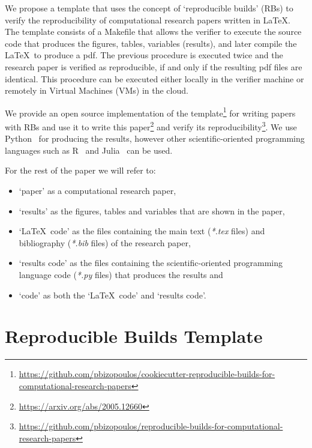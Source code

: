 \documentclass[journal]{IEEEtran}
\begin{document}
We propose a template that uses the concept of `reproducible builds' (RBs) to verify the reproducibility of computational research papers written in \LaTeX.
The template consists of a Makefile that allows the verifier to execute the source code that produces the figures, tables, variables (results), and later compile the \LaTeX\ to produce a pdf.
The previous procedure is executed twice and the research paper is verified as reproducible, if and only if the resulting pdf files are identical.
This procedure can be executed either locally in the verifier machine or remotely in Virtual Machines (VMs) in the cloud.

We provide an open source implementation of the template\footnote{\url{https://github.com/pbizopoulos/cookiecutter-reproducible-builds-for-computational-research-papers}} for writing papers with RBs and use it to write this paper\footnote{\url{https://arxiv.org/abs/2005.12660}} and verify its reproducibility\footnote{\url{https://github.com/pbizopoulos/reproducible-builds-for-computational-research-papers}}.
We use Python~\cite{van2007python} for producing the results, however other scientific-oriented programming languages such as R~\cite{ihaka1996r} and Julia~\cite{bezanson2017julia} can be used.

For the rest of the paper we will refer to:
\begin{itemize}
	\item `paper' as a computational research paper,
	\item `results' as the figures, tables and variables that are shown in the paper,
	\item `\LaTeX\ code' as the files containing the main text (\textit{*.tex} files) and bibliography (\textit{*.bib} files) of the research paper,
	\item `results code' as the files containing the scientific-oriented programming language code (\textit{*.py} files) that produces the results and
	\item `code' as both the `\LaTeX\ code' and `results code'.
\end{itemize}

\section{Reproducible Builds Template}
\end{document}
